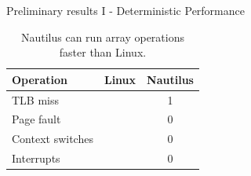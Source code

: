 \begin{block}{Preliminary results I - Deterministic Performance}
  \begin{table}
    \begin{tabular}{l || c | c }
      Operation & Linux & Nautilus \\
      \hline\hline
      TLB miss & & 1 \\
      Page fault & & 0 \\
      Context switches & & 0 \\
      Interrupts & & 0 \\
    \end{tabular}

    \caption{Nautilus can run array operations faster than Linux.}
  \end{table}

\end{block}
